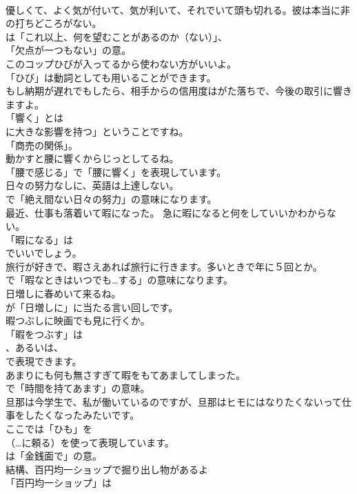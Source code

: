 \documentclass[8pt]{extreport}
\begin{document}
\begin{CJK}{UTF8}{min}
\\	優しくて、よく気が付いて、気が利いて、それでいて頭も切れる。彼は本当に非の打ちどころがない。 
\\	は「これ以上、何を望むことがあるのか（ない）」、
\\	「欠点が一つもない」の意。	
\\	このコップひびが入ってるから使わない方がいいよ。 
\\	「ひび」は動詞としても用いることができます。	
\\	もし納期が遅れでもしたら、相手からの信用度はがた落ちで、今後の取引に響きますよ。 
\\	「響く」とは
\\	に大きな影響を持つ」ということですね。
\\	「商売の関係」。	
\\	動かすと腰に響くからじっとしてるね。 
\\	「腰で感じる」で「腰に響く」を表現しています。	
\\	日々の努力なしに、英語は上達しない。 
\\	で「絶え間ない日々の努力」の意味になります。	
\\	最近、仕事も落着いて暇になった。 急に暇になると何をしていいかわからない。 
\\	「暇になる」は
\\	でいいでしょう。	
\\	旅行が好きで、暇さえあれば旅行に行きます。多いときで年に５回とか。 
\\	で「暇なときはいつでも…する」の意味になります。	
\\	日増しに春めいて来るね。 
\\	が「日増しに」に当たる言い回しです。	
\\	暇つぶしに映画でも見に行くか。 
\\	「暇をつぶす」は
\\	、あるいは、
\\	で表現できます。	
\\	あまりにも何も無さすぎて暇をもてあましてしまった。 
\\	で「時間を持てあます」の意味。	
\\	旦那は今学生で、私が働いているのですが、旦那はヒモにはなりたくないって仕事をしたくなったみたいです。 
\\	ここでは「ひも」を 
\\	（…に頼る）を使って表現しています。
\\	は「金銭面で」の意。	
\\	結構、百円均一ショップで掘り出し物があるよ 
\\	「百円均一ショップ」は 

\end{CJK}
\end{document}
